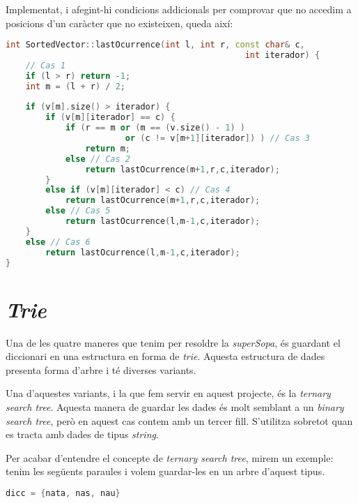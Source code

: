 \documentclass[titlepage]{article}
\begin{document}
Implementat, i afegint-hi condicions addicionals per comprovar que no accedim a posicions d'un caràcter que no existeixen, queda així: \newline
\begin{lstlisting}[language=C++]
int SortedVector::lastOcurrence(int l, int r, const char& c,
                                                int iterador) {
    // Cas 1    
    if (l > r) return -1;
    int m = (l + r) / 2;
   
    if (v[m].size() > iterador) {
        if (v[m][iterador] == c) {
            if (r == m or (m == (v.size() - 1) ) 
                        or (c != v[m+1][iterador]) ) // Cas 3
                return m;
            else // Cas 2
                return lastOcurrence(m+1,r,c,iterador);
        }
        else if (v[m][iterador] < c) // Cas 4
            return lastOcurrence(m+1,r,c,iterador);
        else // Cas 5
            return lastOcurrence(l,m-1,c,iterador);
    }
    else // Cas 6
        return lastOcurrence(l,m-1,c,iterador);   
}
\end{lstlisting}
\clearpage
\section{\textit{Trie}}
Una de les quatre maneres que tenim per resoldre la \textit{superSopa}, és guardant el diccionari en una estructura en forma de \textit{trie}. Aquesta estructura de dades presenta forma d'arbre i té diverses variants. 
\newline\par
Una d'aquestes variants, i la que fem servir en aquest projecte, és la \textit{ternary search tree}. Aquesta manera de guardar les dades és molt semblant a un \textit{binary search tree}, però en aquest cas contem amb un tercer fill. S'utilitza sobretot quan es tracta amb dades de tipus \textit{string}. 
\newline\par
Per acabar d'entendre el concepte de \textit{ternary search tree}, mirem un exemple: tenim les següents paraules i volem guardar-les en un arbre d'aquest tipus.\par
\begin{lstlisting}[language=C++]
    dicc = {nata, nas, nau}
\end{lstlisting}
\end{document}
